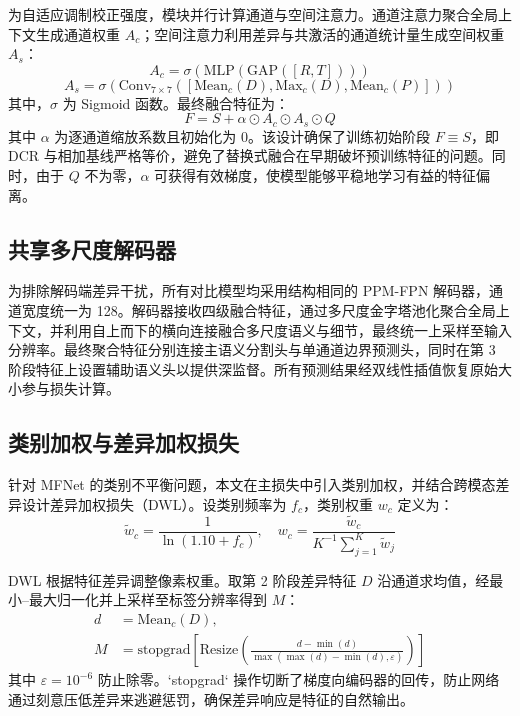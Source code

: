 \documentclass[10pt,conference]{IEEEtran}
\begin{document}
为自适应调制校正强度，模块并行计算通道与空间注意力。通道注意力聚合全局上下文生成通道权重 \(A_c\)；空间注意力利用差异与共激活的通道统计量生成空间权重 \(A_s\)：
\begin{equation}
A_c = \sigma\left( \text{MLP}\left( \text{GAP}([R, T]) \right) \right)
\end{equation}
\begin{equation}
A_s = \sigma\left( \text{Conv}_{7\times7}\left( \left[ \text{Mean}_c(D), \text{Max}_c(D), \text{Mean}_c(P) \right] \right) \right)
\end{equation}
其中，\(\sigma\) 为 Sigmoid 函数。最终融合特征为：
\begin{equation}
F = S + \alpha \odot A_c \odot A_s \odot Q
\end{equation}
其中 \(\alpha\) 为逐通道缩放系数且初始化为 \(0\)。该设计确保了训练初始阶段 \(F \equiv S\)，即 DCR 与相加基线严格等价，避免了替换式融合在早期破坏预训练特征的问题。同时，由于 \(Q\) 不为零，\(\alpha\) 可获得有效梯度，使模型能够平稳地学习有益的特征偏离。

\subsection{共享多尺度解码器}

为排除解码端差异干扰，所有对比模型均采用结构相同的 PPM-FPN 解码器，通道宽度统一为 128。解码器接收四级融合特征，通过多尺度金字塔池化聚合全局上下文，并利用自上而下的横向连接融合多尺度语义与细节，最终统一上采样至输入分辨率。最终聚合特征分别连接主语义分割头与单通道边界预测头，同时在第 3 阶段特征上设置辅助语义头以提供深监督。所有预测结果经双线性插值恢复原始大小参与损失计算。

\subsection{类别加权与差异加权损失}

针对 MFNet 的类别不平衡问题，本文在主损失中引入类别加权，并结合跨模态差异设计差异加权损失（DWL）。设类别频率为 \(f_c\)，类别权重 \(w_c\) 定义为：
\begin{equation}
\tilde{w}_{c}=\frac{1}{\ln{\left(1.10+f_{c}\right)}},\quad w_{c}=\frac{\tilde{w}_{c}}{K^{-1}\sum_{j=1}^{K} \tilde{w}_{j}}
\end{equation}

DWL 根据特征差异调整像素权重。取第 2 阶段差异特征 \(D\) 沿通道求均值，经最小–最大归一化并上采样至标签分辨率得到 \(M\)：
\begin{equation}
\begin{split}
d &= {\text{Mean}}_{c}\left(D\right), \\
M &= \text{stopgrad}\left[\text{Resize}\left(\frac{d-\min{\left(d\right)}}{\max{\left(\max{\left(d\right)}-\min{\left(d\right)},\varepsilon \right)}}\right)\right]
\end{split}
\end{equation}
其中 \(\varepsilon=10^{-6}\) 防止除零。`stopgrad` 操作切断了梯度向编码器的回传，防止网络通过刻意压低差异来逃避惩罚，确保差异响应是特征的自然输出。
\end{document}
